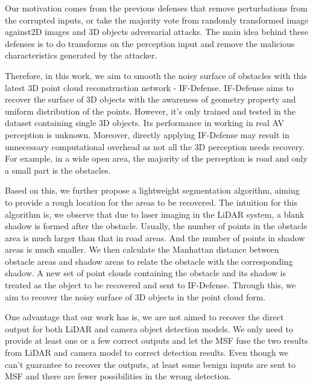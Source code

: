 Our motivation comes from the previous defenses that remove perturbations from the corrupted inputs\cite{8, 14},
 or take the majority vote
from randomly transformed image\cite{12} against2D images and 3D objects adversarial attacks. 
The main idea behind these defenses is to do transforms on
the perception input and remove the malicious characteristics
generated by the attacker. 

Therefore, in this work, we aim to smooth the noisy surface of obstacles with this latest 3D point cloud reconstruction network - IF-Defense\cite{if-defense}.
IF-Defense\cite{if-defense} aims to recover the surface of 3D objects with the awareness of geometry property and uniform distribution of the points.
However, it's only trained and tested in the dataset containing single 3D objects.
Its performance in working in real AV perception is unknown.
Moreover, directly applying IF-Defense\cite{if-defense} may result in unnecessary computational overhead as 
not all the 3D perception needs recovery. 
For example, in a wide open area, the majority of the perception is road and only a small part is the obstacles.

Based on this, we further propose a lightweight segmentation algorithm, aiming to provide a rough location for the areas to be recovered.
The intuition for this algorithm is, we observe that due to laser imaging in the LiDAR system, a blank shadow is formed after the obstacle.
Usually, the number of points in the obstacle area is much larger than that in road areas.
And the number of points in shadow areas is much smaller.
We then calculate the Manhattan distance between obstacle areas and shadow areas to relate the obstacle with the corresponding shadow.
A new set of point clouds containing the obstacle and its shadow is treated as the object to be recovered and sent to IF-Defense\cite{if-defense}.
Through this, we aim to recover the noisy surface of 3D objects in the point cloud form.


One advantage that our work has is, we are not aimed
to recover the direct output for both LiDAR and camera object detection models.
We only need to provide at least one or a few correct outputs and let the
MSF fuse the two results from LiDAR and camera model to correct detection results. 
Even though we can’t guarantee to recover the outputs, at least some benign inputs
are sent to MSF and there are fewer possibilities in the wrong detection.

